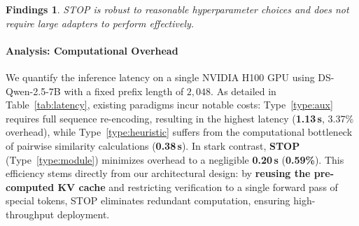 \documentclass[11pt]{article}
\theoremstyle{plain}
\newtheorem{findings}{Findings}
\begin{document}
\begin{findings}
STOP is robust to reasonable hyperparameter choices and does not require large adapters to perform effectively.
\end{findings}

\begin{table}[ht]
\centering
\caption{Effect of the number of \texttt{[STOP]} tokens (DS-Qwen-2.5-1.5B, AIME 2024, $L_{\text{prefix}}=2048$).}
\label{tab:ablation_stop_tokens}
\vspace{-5mm}
\end{table}

\begin{table}[ht]
\vspace{-2mm}
\centering
\caption{Effect of LoRA rank (DS-Qwen-2.5-1.5B, AIME 2024).}
\label{tab:ablation_rank}
\vspace{-5mm}
\end{table}

\paragraph{Analysis: Computational Overhead}
We quantify the inference latency on a single NVIDIA H100 GPU using DS-Qwen-2.5-7B with a fixed prefix length of $2,048$.
As detailed in Table~\ref{tab:latency}, existing paradigms incur notable costs: Type~\ref{type:aux} requires full sequence re-encoding, resulting in the highest latency (\textbf{1.13\,s}, 3.37\% overhead), while Type~\ref{type:heuristic} suffers from the computational bottleneck of pairwise similarity calculations (\textbf{0.38\,s}).
In stark contrast, \textbf{STOP} (Type~\ref{type:module}) minimizes overhead to a negligible \textbf{0.20\,s} (\textbf{0.59\%}).
This efficiency stems directly from our architectural design: by \textbf{reusing the pre-computed KV cache} and restricting verification to a single forward pass of special tokens, STOP eliminates redundant computation, ensuring high-throughput deployment.
\end{document}
